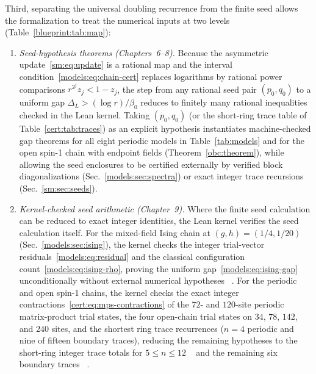 Third, separating the universal doubling recurrence from the finite seed
allows the formalization to treat the numerical inputs at two levels
(Table~\ref{blueprint:tab:map}):
\begin{enumerate}
    \item \emph{Seed-hypothesis theorems (Chapters~6--8).} Because the
          asymmetric update~\eqref{sm:eq:update} is a rational map and the
          interval condition~\eqref{models:eq:chain-cert} replaces logarithms by
          rational power comparisons $r^{2^j}z_j<1-z_j$, the step from any
          rational seed pair $(p_0,q_0)$ to a uniform gap $\Delta_L>(\log r)/\beta_0$
          reduces to finitely many rational inequalities checked in the Lean
          kernel. Taking $(p_0,q_0)$ (or the short-ring trace table of
          Table~\ref{cert:tab:traces}) as an explicit hypothesis instantiates
          machine-checked gap theorems for all eight periodic models in
          Table~\ref{tab:models} and for the open spin-1 chain with endpoint
          fields (Theorem~\ref{obc:theorem}), while allowing the seed enclosures
          to be certified externally by verified block diagonalizations
          (Sec.~\ref{models:sec:spectra}) or exact integer trace recursions
          (Sec.~\ref{sm:sec:seeds}).
    \item \emph{Kernel-checked seed arithmetic (Chapter~9).} Where the
          finite seed calculation can be reduced to exact integer identities, the
          Lean kernel verifies the seed calculation itself. For the mixed-field
          Ising chain at $(g,h)=(1/4,1/20)$ (Sec.~\ref{models:sec:ising}), the
          kernel checks the integer trial-vector residuals~\eqref{models:eq:residual}
          and the classical configuration count~\eqref{models:eq:ising-rho},
          proving the uniform gap~\eqref{models:eq:ising-gap} unconditionally
          without external numerical hypotheses%
          ~.
          For the periodic and open spin-1 chains, the kernel checks the exact
          integer contractions~\eqref{cert:eq:mps-contractions} of the $72$- and
          $120$-site periodic matrix-product trial states, the four open-chain
          trial states on $34$, $78$, $142$, and $240$ sites, and the shortest
          ring trace recurrences ($n=4$ periodic and nine of fifteen boundary
          traces), reducing the remaining hypotheses to the short-ring integer
          trace totals for $5\le n\le12$%
          ~
          and the remaining six boundary traces%
          ~.
\end{enumerate}

